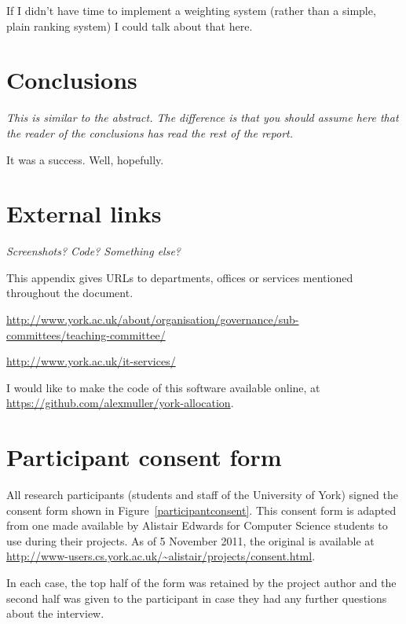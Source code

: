 \documentclass[]{scrartcl}
\begin{document}
If I didn't have time to implement a weighting system (rather than a simple, plain ranking system) I could talk about that here.

\section{Conclusions}

\textit{This is similar to the abstract. The difference is that you should assume here that the reader of the conclusions has read the rest of the report.}

It was a success. Well, hopefully.

\appendix

\newpage
\section{External links}

\textit{Screenshots? Code? Something else?}

This appendix gives URLs to departments, offices or services mentioned throughout the document.

\url{http://www.york.ac.uk/about/organisation/governance/sub-committees/teaching-committee/}

\url{http://www.york.ac.uk/it-services/}

I would like to make the code of this software available online, at \url{https://github.com/alexmuller/york-allocation}.

\newpage
\section{Participant consent form}
\label{sec:consent}

All research participants (students and staff of the University of York) signed the consent form shown in Figure~\ref{participantconsent}. This consent form is adapted from one made available by Alistair Edwards for Computer Science students to use during their projects. As of 5 November 2011, the original is available at \url{http://www-users.cs.york.ac.uk/~alistair/projects/consent.html}.

In each case, the top half of the form was retained by the project author and the second half was given to the participant in case they had any further questions about the interview.
\end{document}
